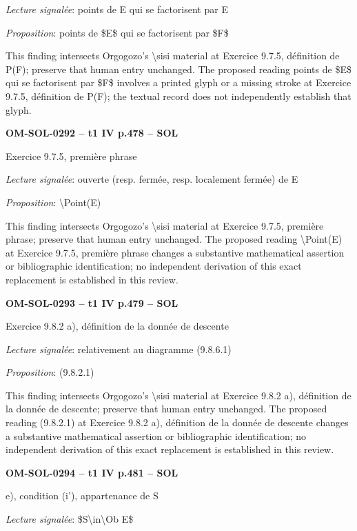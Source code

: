 \emph{Lecture signalée}: points de E qui se factorisent par E\par
\emph{Proposition}: points de \$E\$ qui se factorisent par \$F\$\par
This finding intersects Orgogozo's \textbackslash{}sisi material at Exercice 9.7.5, définition de P(F); preserve that human entry unchanged. The proposed reading points de \$E\$ qui se factorisent par \$F\$ involves a printed glyph or a missing stroke at Exercice 9.7.5, définition de P(F); the textual record does not independently establish that glyph.\par
\par\noindent\textbf{OM-SOL-0292 -- t1 IV p.478 -- SOL}\par
Exercice 9.7.5, première phrase\par
\emph{Lecture signalée}: ouverte (resp. fermée, resp. localement fermée) de E\par
\emph{Proposition}: \textbackslash{}Point(E)\par
This finding intersects Orgogozo's \textbackslash{}sisi material at Exercice 9.7.5, première phrase; preserve that human entry unchanged. The proposed reading \textbackslash{}Point(E) at Exercice 9.7.5, première phrase changes a substantive mathematical assertion or bibliographic identification; no independent derivation of this exact replacement is established in this review.\par
\par\noindent\textbf{OM-SOL-0293 -- t1 IV p.479 -- SOL}\par
Exercice 9.8.2 a), définition de la donnée de descente\par
\emph{Lecture signalée}: relativement au diagramme (9.8.6.1)\par
\emph{Proposition}: (9.8.2.1)\par
This finding intersects Orgogozo's \textbackslash{}sisi material at Exercice 9.8.2 a), définition de la donnée de descente; preserve that human entry unchanged. The proposed reading (9.8.2.1) at Exercice 9.8.2 a), définition de la donnée de descente changes a substantive mathematical assertion or bibliographic identification; no independent derivation of this exact replacement is established in this review.\par
\par\noindent\textbf{OM-SOL-0294 -- t1 IV p.481 -- SOL}\par
e), condition (i'), appartenance de S\par
\emph{Lecture signalée}: \$S\textbackslash{}in\textbackslash{}Ob E\$\par
